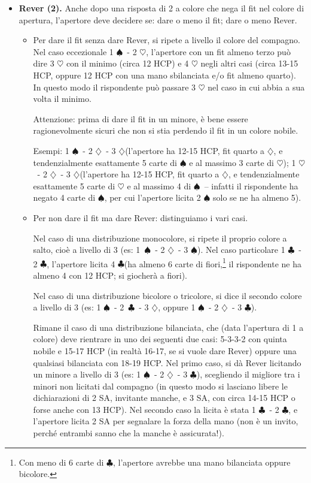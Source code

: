 \documentclass[a4paper,10pt]{article}
\renewcommand{\c}{$\clubsuit$\xspace}
\renewcommand{\d}{$\diamondsuit$\xspace}
\newcommand{\h}{$\heartsuit$\xspace}
\newcommand{\s}{$\spadesuit$\xspace}
\newcommand{\sa}{SA\xspace}
\begin{document}
\begin{itemize}
 Ulteriore esempio: su 1 \d\ - 1 \s, con la distribuzione 4\d\ - 4\h\ - 3\s\ - 2\c e meno di 16 HCP, l'apertore licita 1 \sa e non 2 \h.
 
 \item {\bf Rever (2).} Anche dopo una risposta di 2 a colore che nega il fit nel colore di apertura, l'apertore deve decidere se: dare o meno il fit; dare o meno Rever.
 \begin{itemize}
  \item Per dare il fit senza dare Rever, si ripete a livello il colore del compagno. Nel caso eccezionale 1 \s\ - 2 \h, l'apertore con un fit almeno terzo può dire 3 \h con il minimo (circa 12 HCP) e 4 \h negli altri casi (circa 13-15 HCP, oppure 12 HCP con una mano sbilanciata e/o fit almeno quarto). In questo modo il rispondente può passare 3 \h nel caso in cui abbia a sua volta il minimo.
  
  Attenzione: prima di dare il fit in un minore, è bene essere ragionevolmente sicuri che non si stia perdendo il fit in un colore nobile.
  
  Esempi: 1 \s\ - 2 \d\ - 3 \d (l'apertore ha 12-15 HCP, fit quarto a \d, e tendenzialmente esattamente 5 carte di \s e al massimo 3 carte di \h);
  1 \h\ - 2 \d\ - 3 \d (l'apertore ha 12-15 HCP, fit quarto a \d, e tendenzialmente esattamente 5 carte di \h e al massimo 4 di \s\ -- infatti il rispondente ha negato 4 carte di \s, per cui l'apertore licita 2 \s solo se ne ha almeno 5).
  
  \item Per non dare il fit ma dare Rever: distinguiamo i vari casi.
  
  Nel caso di una distribuzione monocolore, si ripete il proprio colore a salto, cioè a livello di 3 (es: \mbox{1 \s}\ - 2 \d\ - 3 \s). Nel caso particolare 1 \c\ - 2 \c, l'apertore licita 4 \c (ha almeno 6 carte di fiori,\footnote{Con meno di 6 carte di \c, l'apertore avrebbe una mano bilanciata oppure bicolore.} il rispondente ne ha almeno 4 con 12 HCP; si giocherà a fiori).
  
  Nel caso di una distribuzione bicolore o tricolore, si dice il secondo colore a livello di 3 (es: 1 \s\ - \mbox{2 \c}\ - 3 \d, oppure 1 \s\ - 2 \d\ - 3 \c).
  
  Rimane il caso di una distribuzione bilanciata, che (data l'apertura di 1 a colore) deve rientrare in uno dei seguenti due casi: 5-3-3-2 con quinta nobile e 15-17 HCP (in realtà 16-17, se si vuole dare Rever) oppure una qualsiasi bilanciata con 18-19 HCP. Nel primo caso, si dà Rever licitando un minore a livello di 3 (es: 1 \s\ - 2 \d\ - 3 \c), scegliendo il migliore tra i minori non licitati dal compagno (in questo modo si lasciano libere le dichiarazioni di 2 \sa, invitante manche, e 3 \sa, con circa 14-15 HCP o forse anche con 13 HCP).
  Nel secondo caso la licita è stata 1 \c\ - 2 \c, e l'apertore licita 2 \sa per segnalare la forza della mano (non è un invito, perché entrambi sanno che la manche è assicurata!).
  

\end{itemize}
\end{itemize}
\end{document}
